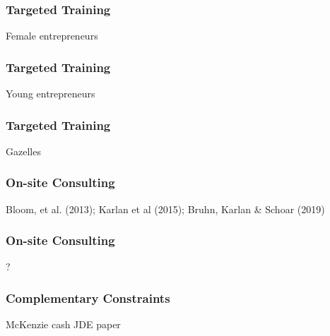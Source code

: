 \documentclass[hideothersubsections, usenames,dvipsnames,10pt]{beamer}
\newenvironment{itemize_3pt}{\itemize\addtolength{\itemsep}{3pt}}{\enditemize}
\begin{document}
\begin{frame}
\frametitle{Targeted Training}
	\begin{itemize_3pt}
	\item Female entrepreneurs
	\vspace{0.1in}
	\end{itemize_3pt}
\end{frame}

\begin{frame}
\frametitle{Targeted Training}
	\begin{itemize_3pt}
	\item Young entrepreneurs
	\vspace{0.1in}
	\end{itemize_3pt}
\end{frame}

\begin{frame}
\frametitle{Targeted Training}
	\begin{itemize_3pt}
	\item Gazelles
	\vspace{0.1in}
	\end{itemize_3pt}
\end{frame}


\begin{frame}
\frametitle{On-site Consulting}
	\begin{itemize_3pt}
	\item Bloom, et al. (2013); Karlan et al (2015); Bruhn, Karlan \& Schoar (2019)
	\vspace{0.1in}
	\end{itemize_3pt}
\end{frame}

\begin{frame}
\frametitle{On-site Consulting}
	\begin{itemize_3pt}
	\item ?
	\vspace{0.1in}
	\end{itemize_3pt}
\end{frame}


\begin{frame}
\frametitle{Complementary Constraints}
	\begin{itemize_3pt}
	\item McKenzie cash JDE paper
	\vspace{0.1in}
	\end{itemize_3pt}
\end{frame}
\end{document}
